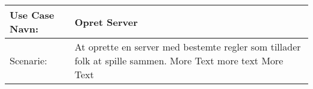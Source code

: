 \documentclass[12pt]{article}
\begin{document}
\begin{table}[h]
{\renewcommand\arraystretch{1.25}
\begin{tabular}{|l|l|l|} \hline
Use Case Navn:& \multicolumn{2}{l|}{Opret Server} \\ \hline\hline
Scenarie:& \multicolumn{2}{p{4cm}|}{\raggedright At oprette en server med bestemte regler som tillader folk at spille sammen. More Text more text More Text} \\ \hline
\end{tabular}}
\end{table}
\end{document}
